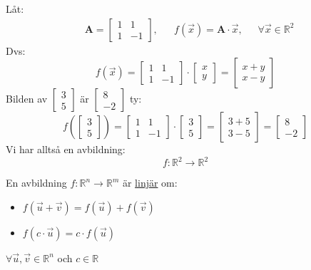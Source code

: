 \begin{Ex}
    Låt:
    \begin{align*}
    &\mathbf{A}= \begin{bmatrix} 1&1\\1&-1 \end{bmatrix}, &&f(\vec{x}) = \mathbf{A} \cdot \vec{x} \mbox{,  }\mbox{ }\mbox{ }\forall \vec{x} \in \mathbb{R}^2
    \end{align*}
    Dvs:
    \[
        f(\vec{x}) = \begin{bmatrix} 1&1\\1&-1 \end{bmatrix} \cdot \begin{bmatrix} x\\y \end{bmatrix} = \begin{bmatrix} x+y\\x-y \end{bmatrix}
    \]
    Bilden av $\begin{bmatrix} 3\\5 \end{bmatrix}$ är $\begin{bmatrix} 8\\-2 \end{bmatrix}$ ty:
    \[
        f(\begin{bmatrix} 3\\5 \end{bmatrix}) = \begin{bmatrix} 1&1\\1&-1 \end{bmatrix} \cdot \begin{bmatrix} 3\\5 \end{bmatrix} = \begin{bmatrix} 3+5\\3-5 \end{bmatrix} = \begin{bmatrix} 8\\-2 \end{bmatrix}
    \]
    Vi har alltså en avbildning:
	\[
	    f: \mathbb{R}^2 \rightarrow \mathbb{R}^2
	\]
\end{Ex}
\begin{Def}
    En avbildning $f: \mathbb{R}^n \rightarrow \mathbb{R}^m$ är \underline{linjär} om:
    \begin{itemize}
    	\item $f(\vec{u} + \vec{v}) = f(\vec{u}) + f(\vec{v})$
    	\item $f(c \cdot \vec{u}) = c \cdot f(\vec{u})$
    \end{itemize}
    $\forall \vec{u}, \vec{v} \in \mathbb{R}^n$ och $c \in \mathbb{R}$
\end{Def}
